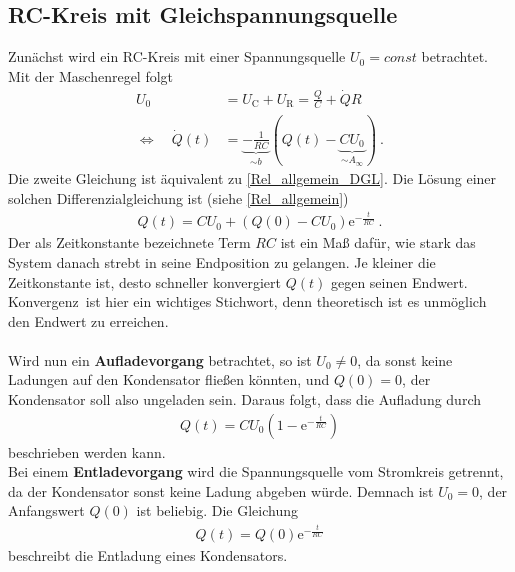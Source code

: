 \subsection{RC-Kreis mit Gleichspannungsquelle \label{sec:Gleichspannung}}
Zunächst wird ein RC-Kreis mit einer Spannungsquelle $U_0 = const$ betrachtet. Mit der Maschenregel folgt
\begin{align}
	U_0 &= U_\text{C} + U_\text{R} = \frac{Q}{C} + \dot{Q}R \\
	\Leftrightarrow\quad \dot{Q}(t) &= \underbrace{-\frac{1}{RC}}_{\sim b}(Q(t) - \underbrace{CU_0}_{\sim A_\infty}) \ .
\end{align}
Die zweite Gleichung ist äquivalent zu \eqref{Rel_allgemein_DGL}. Die Lösung einer solchen Differenzialgleichung ist (siehe \eqref{Rel_allgemein})
\begin{align}
	Q(t) = CU_0 + \left( Q(0) - CU_0 \right)\mathrm{e}^{-\frac{t}{RC}} \ .
\end{align}
Der als Zeitkonstante bezeichnete Term $RC$ ist ein Maß dafür, wie stark das System danach strebt in seine Endposition zu gelangen. Je kleiner die Zeitkonstante ist, desto schneller konvergiert $Q(t)$ gegen seinen Endwert. \glqq Konvergenz\grqq\ ist hier ein wichtiges Stichwort, denn theoretisch ist es unmöglich den Endwert zu erreichen. \\
\ \\
Wird nun ein \textbf{Aufladevorgang} betrachtet, so ist $U_0 \not= 0$, da sonst keine Ladungen auf den Kondensator fließen könnten, und $Q(0) = 0$, der Kondensator soll also ungeladen sein. Daraus folgt, dass die Aufladung durch
\begin{align}
	Q(t) = CU_0 \left( 1 - \mathrm{e}^{-\frac{t}{RC}} \right)
	\label{eq:aufladen}
\end{align}
beschrieben werden kann. \\
Bei einem \textbf{Entladevorgang} wird die Spannungsquelle vom Stromkreis getrennt, da der Kondensator sonst keine Ladung abgeben würde. Demnach ist $U_0 = 0$, der Anfangswert $Q(0)$ ist beliebig. Die Gleichung
\begin{align}
	Q(t) = Q(0)\mathrm{e}^{-\frac{t}{RC}}
\end{align}
beschreibt die Entladung eines Kondensators.


